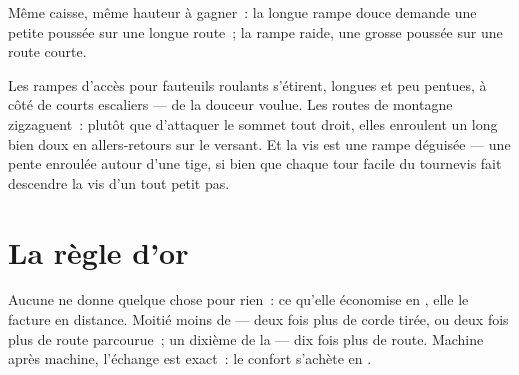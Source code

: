 \begin{omfigure}

{\small Même caisse, même hauteur à gagner~: la longue rampe douce
demande une petite poussée sur une longue route~; la rampe raide, une
grosse poussée sur une route courte.}
\end{omfigure}

\begin{example}\label{ex:g5:simple-machines:ramps}
Les rampes d'accès pour fauteuils roulants s'étirent, longues et peu
pentues, à côté de courts escaliers --- de la douceur voulue. Les
routes de montagne zigzaguent~: plutôt que d'attaquer le sommet tout
droit, elles enroulent un long  bien doux en
allers-retours sur le versant. Et la vis est une rampe déguisée ---
une pente enroulée autour d'une tige, si bien que chaque tour facile
du tournevis fait descendre la vis d'un tout petit pas.
\end{example}

\section{La règle d'or}

\begin{proposition}\label{prop:g5:simple-machines:golden}
Aucune  ne donne quelque chose pour rien~: ce qu'elle
économise en , elle le facture en distance. Moitié moins de
 --- deux fois plus de corde tirée, ou deux fois plus de route
parcourue~; un dixième de la  --- dix fois plus de route.
Machine après machine, l'échange est exact~: le confort s'achète en
.
\end{proposition}

